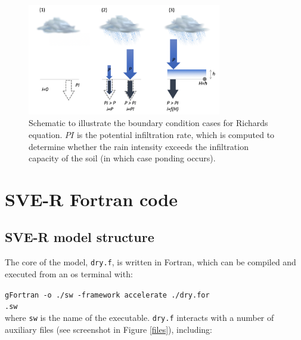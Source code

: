 \documentclass{article}
\newcommand{\code}[1]{\texttt{#1}}
\begin{document}
 	
 \begin{figure}[h]
 \centering
\includegraphics[width=20pc]{grid/richards.png}
 \caption{Schematic to illustrate the boundary condition cases for Richards equation. $PI$ is the potential infiltration rate, which is computed to determine whether the rain intensity exceeds the infiltration capacity of the soil (in which case ponding occurs).}
 \label{richardgrid}
 \end{figure}	


\newpage

\section{SVE-R Fortran code}
\label{SVE_solver}


\subsection{SVE-R model structure}

The core of the model, \code{dry.f}, is written in Fortran, which can be compiled and executed from an os terminal with:

\hspace*{8mm}	\code{gFortran -o ./sw  -framework accelerate ./dry.for} \\
\hspace*{8mm}  \code{.sw} \\

 where \code{sw} is the name of the executable.  \code{dry.f} interacts with a number of auxiliary files (see screenshot in Figure \ref{files}), including:
\end{document}
